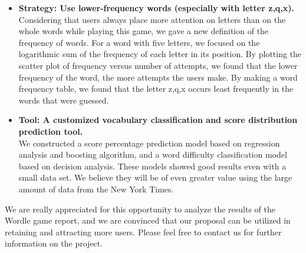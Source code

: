 \documentclass[12pt]{article}
\begin{document}
\begin{itemize}
        \item \textbf{Strategy:  Use lower-frequency words (especially with letter z,q,x).}
    \\
            Considering that users always place more attention on letters than on the whole words while playing this game, we gave a new definition of the frequency of words. For a word with five letters, we focused on the logarithmic sum of the frequency of each letter in its position.
            By plotting the scatter plot of frequency versus number of attempts, we found that the lower frequency of the word, the more attempts the users make.
            By making a word frequency table, we found that the letter z,q,x occurs least frequently in the words that were guessed.
        \item \textbf{Tool: A customized vocabulary classification and score distribution prediction tool.}\\
        We constructed a score percentage prediction model based on regression analysis and boosting algorithm, and a word difficulty classification model based on decision analysis. These models showed good results even with a small data set. We believe they will be of even greater value using the large amount of data from the New York Times.



\end{itemize}







 We are really appreciated for this opportunity to analyze the results of the Wordle game report, and we are convinced that our proposal can be utilized in retaining and attracting more users. Please feel free to contact us for further information on the project.


 \vspace{0.3cm} 

 \vspace{0.1cm} 








\newpage
\end{document}
